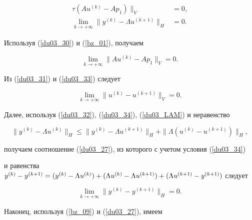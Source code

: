 \begin{pf}
\begin{align}
\tau (A u^{(k)}- A p_1) \|_V &=0,\label{du03_31} \\


%


\lim_{k \to+\infty} \| y^{(k)}-\Lambda u^{(k+1)} \|_H &=0 .


\label{du03_32}


\end{align}


Используя (\ref{du03_30}) и (\ref{bz_01}), получаем


\begin{equation}


\lim_{k \to+\infty} \| A u^{(k)}- A p_1 \|_V =0.


\label{du03_33}


\end{equation}


Из (\ref{du03_31}) и (\ref{du03_33}) следует


\begin{equation}


\lim_{k \to+\infty} \| u^{(k)} -u^{(k+1)} \|_V =0.


\label{du03_34}


\end{equation}


Далее, используя (\ref{du03_32}), (\ref{du03_34}), (\ref{du03_LAM}) и неравенство


$$


\| y^{(k)}-\Lambda u^{(k)} \|_H \leq \| y^{(k)}-\Lambda u^{(k+1)} \|_H+


\| \Lambda (u^{(k)}-u^{(k+1)}) \|_H ,


$$


получаем соотношение (\ref{du03_27}), из которого с учетом условия (\ref{du03_34}) 


и равенства $y^{(k)} -y^{(k+1)}=\linebreak (y^{(k)} -\Lambda u^{(k)}) 


+(\Lambda u^{(k)}-\Lambda u^{(k+1)})+


(\Lambda u^{(k+1)} -y^{(k+1)})$ следует


\begin{equation}


\lim_{k \to+\infty} \| y^{(k)} -y^{(k+1)} \|_H =0 .


\label{du03_35}


\end{equation}





Наконец, используя (\ref{bz_09}) и (\ref{du03_27}), имеем



\end{pf}

